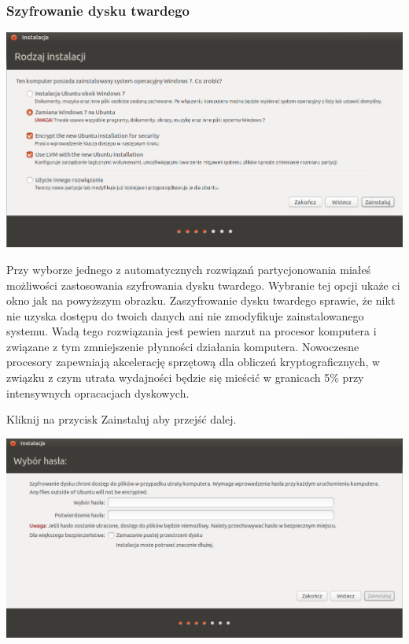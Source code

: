 \subsubsection{Szyfrowanie dysku twardego}
\begin{center}
        \includegraphics[width=\linewidth]{images/instalator_partycjonowanie_szyfrowanie1.png}
\end{center}

Przy wyborze jednego z automatycznych rozwiązań partycjonowania miałeś możliwości zastosowania szyfrowania dysku twardego. Wybranie tej opcji ukaże ci okno jak na powyższym obrazku. Zaszyfrowanie dysku twardego sprawie, że nikt nie uzyska dostępu do twoich danych ani nie zmodyfikuje zainstalowanego systemu. Wadą tego rozwiązania jest pewien narzut na procesor komputera i związane z tym zmniejszenie płynności działania komputera. Nowoczesne procesory zapewniają akcelerację sprzętową dla obliczeń kryptograficznych, w związku z czym utrata wydajności będzie się mieścić w granicach 5\% przy intensywnych opracacjach dyskowych.
\begin{flushright}
Kliknij na przycisk \textcolor{ubuntu_orange}{Zainstaluj} aby przejść dalej.
\end{flushright}
\clearpage
\begin{center}
        \includegraphics[width=\linewidth]{images/instalator_partycjonowanie_szyfrowanie2.png}
\end{center}

